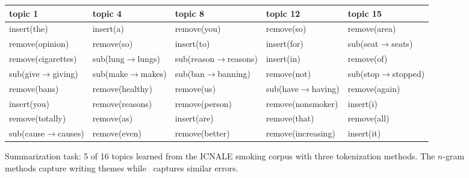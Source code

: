 \begin{figure*}[t]
{\begin{center}
    \vspace{.05in}
    \textbf{\sd}

    \begin{tabular}{|l|l|l|l|l|}
    \hline
    \textbf{topic 1} & \textbf{topic 4} & \textbf{topic 8} & \textbf{topic 12}
    & \textbf{topic 15} \\
    \hline
    insert(the) & insert(a) & remove(you) & remove(so) & remove(area) \\
    remove(opinion) & remove(so) & insert(to) & insert(for) & sub(seat$\rightarrow$seats) \\
    remove(cigarettes) & sub(lung$\rightarrow$lungs) & sub(reason$\rightarrow$reasons) & insert(in) & remove(of) \\
    sub(give$\rightarrow$giving) & sub(make$\rightarrow$makes) &
    sub(ban$\rightarrow$banning) & remove(not) & sub(stop$\rightarrow$stopped) \\
    remove(bans) & remove(healthy) & remove(us) & sub(have$\rightarrow$having) & remove(again) \\
    insert(you) & remove(reasons) & remove(person) & remove(nonsmoker) & insert(i)\\
    remove(totally) & remove(as) & insert(are) & remove(that) & remove(all) \\
    sub(cause$\rightarrow$causes) & remove(even) & remove(better) & remove(increasing) & insert(it) \\
    \hline
    \end{tabular}
    \caption{Summarization task: 5 of 16 topics learned from the
    ICNALE smoking corpus with three tokenization methods. The
$n$-gram methods capture writing themes while \sd~captures similar errors.}
    \label{fig-topics}
\end{center}
}
\vskip-20pt
\end{figure*}

